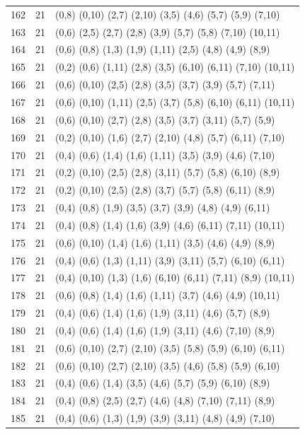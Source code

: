 {\begin{longtable}{lll}
162 & 21 & (0,8) (0,10) (2,7) (2,10) (3,5) (4,6) (5,7) (5,9) (7,10) \\
163 & 21 & (0,6) (2,5) (2,7) (2,8) (3,9) (5,7) (5,8) (7,10) (10,11) \\
164 & 21 & (0,6) (0,8) (1,3) (1,9) (1,11) (2,5) (4,8) (4,9) (8,9) \\
165 & 21 & (0,2) (0,6) (1,11) (2,8) (3,5) (6,10) (6,11) (7,10) (10,11) \\
166 & 21 & (0,6) (0,10) (2,5) (2,8) (3,5) (3,7) (3,9) (5,7) (7,11) \\
167 & 21 & (0,6) (0,10) (1,11) (2,5) (3,7) (5,8) (6,10) (6,11) (10,11) \\
168 & 21 & (0,6) (0,10) (2,7) (2,8) (3,5) (3,7) (3,11) (5,7) (5,9) \\
169 & 21 & (0,2) (0,10) (1,6) (2,7) (2,10) (4,8) (5,7) (6,11) (7,10) \\
170 & 21 & (0,4) (0,6) (1,4) (1,6) (1,11) (3,5) (3,9) (4,6) (7,10) \\
171 & 21 & (0,2) (0,10) (2,5) (2,8) (3,11) (5,7) (5,8) (6,10) (8,9) \\
172 & 21 & (0,2) (0,10) (2,5) (2,8) (3,7) (5,7) (5,8) (6,11) (8,9) \\
173 & 21 & (0,4) (0,8) (1,9) (3,5) (3,7) (3,9) (4,8) (4,9) (6,11) \\
174 & 21 & (0,4) (0,8) (1,4) (1,6) (3,9) (4,6) (6,11) (7,11) (10,11) \\
175 & 21 & (0,6) (0,10) (1,4) (1,6) (1,11) (3,5) (4,6) (4,9) (8,9) \\
176 & 21 & (0,4) (0,6) (1,3) (1,11) (3,9) (3,11) (5,7) (6,10) (6,11) \\
177 & 21 & (0,4) (0,10) (1,3) (1,6) (6,10) (6,11) (7,11) (8,9) (10,11) \\
178 & 21 & (0,6) (0,8) (1,4) (1,6) (1,11) (3,7) (4,6) (4,9) (10,11) \\
179 & 21 & (0,4) (0,6) (1,4) (1,6) (1,9) (3,11) (4,6) (5,7) (8,9) \\
180 & 21 & (0,4) (0,6) (1,4) (1,6) (1,9) (3,11) (4,6) (7,10) (8,9) \\
181 & 21 & (0,6) (0,10) (2,7) (2,10) (3,5) (5,8) (5,9) (6,10) (6,11) \\
182 & 21 & (0,6) (0,10) (2,7) (2,10) (3,5) (4,6) (5,8) (5,9) (6,10) \\
183 & 21 & (0,4) (0,6) (1,4) (3,5) (4,6) (5,7) (5,9) (6,10) (8,9) \\
184 & 21 & (0,4) (0,8) (2,5) (2,7) (4,6) (4,8) (7,10) (7,11) (8,9) \\
185 & 21 & (0,4) (0,6) (1,3) (1,9) (3,9) (3,11) (4,8) (4,9) (7,10) \\

\end{longtable}}
